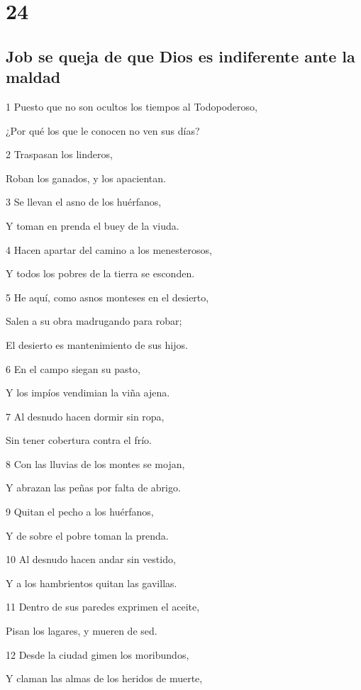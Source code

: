 \chapter{24}

\section*{Job se queja de que Dios es indiferente ante la maldad}

\par 1 Puesto que no son ocultos los tiempos al Todopoderoso,
\par ¿Por qué los que le conocen no ven sus días?
\par 2 Traspasan los linderos,
\par Roban los ganados, y los apacientan.
\par 3 Se llevan el asno de los huérfanos,
\par Y toman en prenda el buey de la viuda.
\par 4 Hacen apartar del camino a los menesterosos,
\par Y todos los pobres de la tierra se esconden.
\par 5 He aquí, como asnos monteses en el desierto,
\par Salen a su obra madrugando para robar;
\par El desierto es mantenimiento de sus hijos.
\par 6 En el campo siegan su pasto,
\par Y los impíos vendimian la viña ajena.
\par 7 Al desnudo hacen dormir sin ropa,
\par Sin tener cobertura contra el frío.
\par 8 Con las lluvias de los montes se mojan,
\par Y abrazan las peñas por falta de abrigo.
\par 9 Quitan el pecho a los huérfanos,
\par Y de sobre el pobre toman la prenda.
\par 10 Al desnudo hacen andar sin vestido,
\par Y a los hambrientos quitan las gavillas.
\par 11 Dentro de sus paredes exprimen el aceite,
\par Pisan los lagares, y mueren de sed.
\par 12 Desde la ciudad gimen los moribundos,
\par Y claman las almas de los heridos de muerte,
